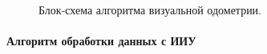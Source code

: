 \begin{figure}[H]
\caption{Блок-схема алгоритма визуальной одометрии.}
\label{pic:visualOdometryAlgo}
\end{figure}

\paragraph{Алгоритм обработки данных с ИИУ}

